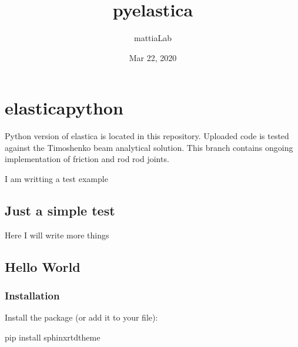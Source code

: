 \documentclass[letterpaper,10pt,english]{sphinxmanual}
\title{pyelastica}
\date{Mar 22, 2020}
\author{mattiaLab}
\begin{document}
\pagestyle{empty}
\sphinxmaketitle
\pagestyle{plain}
\sphinxtableofcontents
\pagestyle{normal}
\label{\detokenize{index::doc}}



\chapter{elastica\sphinxhyphen{}python}
\label{\detokenize{index:elastica-python}}


Python version of elastica is located in this repository. Uploaded code is tested against the Timoshenko beam analytical solution. This branch contains ongoing implementation of friction and rod rod joints.

I am writting a test example


\section{Just a simple test}
\label{\detokenize{welcome_page:just-a-simple-test}}\label{\detokenize{welcome_page::doc}}
Here I will write more things


\section{Hello World}
\label{\detokenize{another_page:hello-world}}\label{\detokenize{another_page::doc}}

\subsection{Installation}
\label{\detokenize{another_page:installation}}
Install the package (or add it to your  file):

\begin{sphinxVerbatim}[commandchars=\\\{\}]
 pip install sphinx\PYGZus{}rtd\PYGZus{}theme
\end{sphinxVerbatim}
\end{document}
